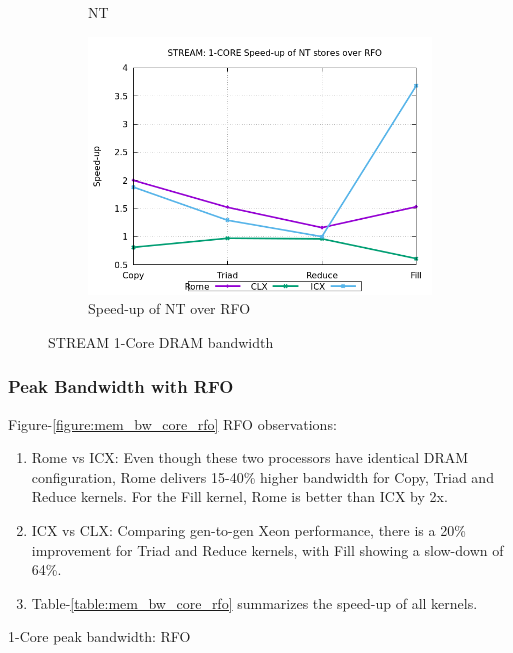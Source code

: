 \documentclass{article}
\begin{document}
\begin{figure}[!ht]
\begin{subfigure}[!ht]{0.3\textwidth}
         \caption{NT}
         \label{figure:mem_bw_core_nt}
    \end{subfigure}
    \begin{subfigure}[!ht]{0.3\textwidth}
         \centering
         \includegraphics[width=\textwidth]{../data/rome-clx-icx/mem_bw_core/mb_core_nt_rfo}
         \caption{Speed-up of NT over RFO}
         \label{figure:mem_bw_core_nt_rfo}
    \end{subfigure}

    \caption{STREAM 1-Core DRAM bandwidth}
    \label{figure:mem_bw_core}
\end{figure}

\subsubsection{Peak Bandwidth with RFO}
Figure-\ref{figure:mem_bw_core_rfo} RFO observations:
\begin{enumerate}
\item Rome vs ICX: Even though these two processors have identical DRAM configuration, Rome delivers 15-40\% higher bandwidth for Copy, Triad and Reduce kernels. For the Fill kernel, Rome is better than ICX by 2x.
\item ICX vs CLX: Comparing gen-to-gen Xeon performance, there is a 20\% improvement for Triad and Reduce kernels, with Fill showing a slow-down of 64\%.
\item Table-\ref{table:mem_bw_core_rfo} summarizes the speed-up of all kernels.
\end{enumerate}

\begin{table}[h!]
\centering

\caption{1-Core peak bandwidth: RFO}
\label{table:mem_bw_core_rfo}
\end{table}
\end{document}
